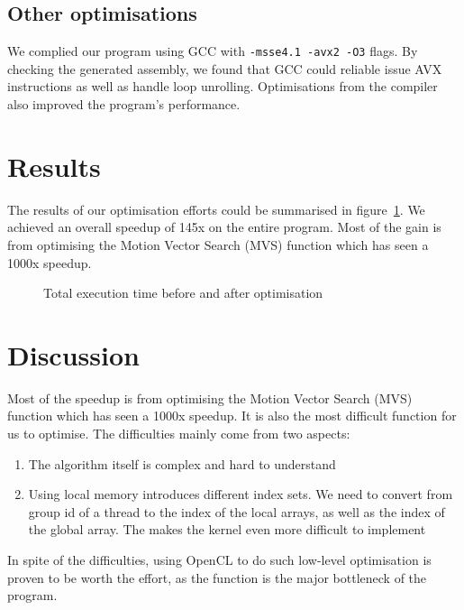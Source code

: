 \documentclass[a4paper]{article}
\begin{document}
\subsection{Other optimisations}
We complied our program using GCC with \verb|-msse4.1 -avx2 -O3|
flags. By checking the generated assembly, we found that GCC could
reliable issue AVX instructions as well as handle loop unrolling.
Optimisations from the compiler also improved the program's
performance.

\section{Results}
The results of our optimisation efforts could be summarised in
figure~\ref{fig:before_after_bar}. We achieved an overall speedup of
145x on the entire program. Most of the gain is from optimising the
Motion Vector Search (MVS) function which has seen a 1000x speedup.
\begin{figure}[h]
  \centering
  \caption{Total execution time before and after optimisation}
  \label{fig:before_after_bar}
\end{figure}

\section{Discussion}
Most of the speedup is from optimising the Motion Vector Search (MVS)
function which has seen a 1000x speedup. It is also the most difficult
function for us to optimise. The difficulties mainly come from two
aspects:
\begin{enumerate}
\item The algorithm itself is complex and hard to understand
\item Using local memory introduces different index sets. We need to
  convert from group id of a thread to the index of the local arrays,
  as well as the index of the global array. The makes the kernel even
  more difficult to implement
\end{enumerate}

In spite of the difficulties, using OpenCL to do such low-level
optimisation is proven to be worth the effort, as the function is the
major bottleneck of the program.
\end{document}
